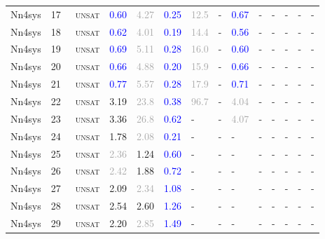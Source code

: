 \begin{center}
{\begin{longtable}{@{}llllllllllllll@{}}
Nn4sys & 17 & ~\textsc{unsat} & \textcolor{blue}{0.60} & \textcolor{darkgray}{4.27} & \textcolor{blue}{0.25} & \textcolor{darkgray}{12.5} & - & \textcolor{blue}{0.67} & - & - & - & - & - \\
Nn4sys & 18 & ~\textsc{unsat} & \textcolor{blue}{0.62} & \textcolor{darkgray}{4.01} & \textcolor{blue}{0.19} & \textcolor{darkgray}{14.4} & - & \textcolor{blue}{0.56} & - & - & - & - & - \\
Nn4sys & 19 & ~\textsc{unsat} & \textcolor{blue}{0.69} & \textcolor{darkgray}{5.11} & \textcolor{blue}{0.28} & \textcolor{darkgray}{16.0} & - & \textcolor{blue}{0.60} & - & - & - & - & - \\
Nn4sys & 20 & ~\textsc{unsat} & \textcolor{blue}{0.66} & \textcolor{darkgray}{4.88} & \textcolor{blue}{0.20} & \textcolor{darkgray}{15.9} & - & \textcolor{blue}{0.66} & - & - & - & - & - \\
Nn4sys & 21 & ~\textsc{unsat} & \textcolor{blue}{0.77} & \textcolor{darkgray}{5.57} & \textcolor{blue}{0.28} & \textcolor{darkgray}{17.9} & - & \textcolor{blue}{0.71} & - & - & - & - & - \\
Nn4sys & 22 & ~\textsc{unsat} & \textcolor{second}{3.19} & \textcolor{darkgray}{23.8} & \textcolor{blue}{0.38} & \textcolor{darkgray}{96.7} & - & \textcolor{darkgray}{4.04} & - & - & - & - & - \\
Nn4sys & 23 & ~\textsc{unsat} & \textcolor{second}{3.36} & \textcolor{darkgray}{26.8} & \textcolor{blue}{0.62} & - & - & \textcolor{darkgray}{4.07} & - & - & - & - & - \\
Nn4sys & 24 & ~\textsc{unsat} & \textcolor{second}{1.78} & \textcolor{darkgray}{2.08} & \textcolor{blue}{0.21} & - & - & - & - & - & - & - & - \\
Nn4sys & 25 & ~\textsc{unsat} & \textcolor{darkgray}{2.36} & \textcolor{second}{1.24} & \textcolor{blue}{0.60} & - & - & - & - & - & - & - & - \\
Nn4sys & 26 & ~\textsc{unsat} & \textcolor{darkgray}{2.42} & \textcolor{second}{1.88} & \textcolor{blue}{0.72} & - & - & - & - & - & - & - & - \\
Nn4sys & 27 & ~\textsc{unsat} & \textcolor{second}{2.09} & \textcolor{darkgray}{2.34} & \textcolor{blue}{1.08} & - & - & - & - & - & - & - & - \\
Nn4sys & 28 & ~\textsc{unsat} & \textcolor{second}{2.54} & \textcolor{second}{2.60} & \textcolor{blue}{1.26} & - & - & - & - & - & - & - & - \\
Nn4sys & 29 & ~\textsc{unsat} & \textcolor{second}{2.20} & \textcolor{darkgray}{2.85} & \textcolor{blue}{1.49} & - & - & - & - & - & - & - & - \\

\end{longtable}}
\end{center}
